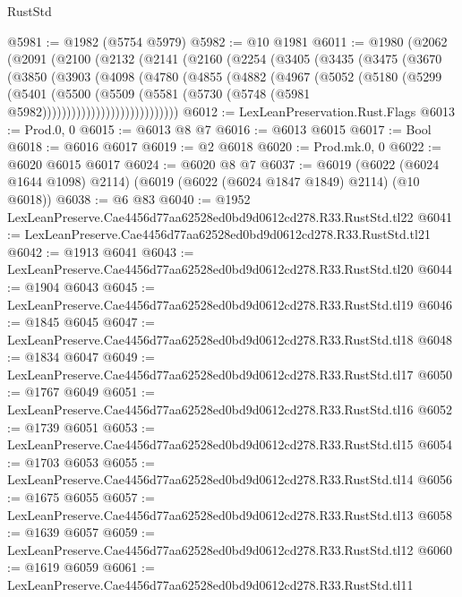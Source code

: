 \begin{lexlean}{RustStd}
\begin{coremodule}
@5981 := @1982 (@5754 @5979)
@5982 := @10 @1981
@6011 := @1980
    (@2062
      (@2091
        (@2100
          (@2132
            (@2141
              (@2160
                (@2254
                  (@3405
                    (@3435
                      (@3475
                        (@3670
                          (@3850
                            (@3903
                              (@4098
                                (@4780
                                  (@4855
                                    (@4882
                                      (@4967
                                        (@5052
                                          (@5180
                                            (@5299
                                              (@5401
                                                (@5500
                                                  (@5509
                                                    (@5581
                                                      (@5730
                                                        (@5748
                                                          (@5981 @5982))))))))))))))))))))))))))))
@6012 := LexLeanPreservation.Rust.Flags
@6013 := Prod.{0, 0}
@6015 := @6013 @8 @7
@6016 := @6013 @6015
@6017 := Bool
@6018 := @6016 @6017
@6019 := @2 @6018
@6020 := Prod.mk.{0, 0}
@6022 := @6020 @6015 @6017
@6024 := @6020 @8 @7
@6037 := @6019
    (@6022 (@6024 @1644 @1098) @2114)
    (@6019 (@6022 (@6024 @1847 @1849) @2114) (@10 @6018))
@6038 := @6 @83
@6040 := @1952 LexLeanPreserve.Cae4456d77aa62528ed0bd9d0612cd278.R33.RustStd.tl22
@6041 := LexLeanPreserve.Cae4456d77aa62528ed0bd9d0612cd278.R33.RustStd.tl21
@6042 := @1913 @6041
@6043 := LexLeanPreserve.Cae4456d77aa62528ed0bd9d0612cd278.R33.RustStd.tl20
@6044 := @1904 @6043
@6045 := LexLeanPreserve.Cae4456d77aa62528ed0bd9d0612cd278.R33.RustStd.tl19
@6046 := @1845 @6045
@6047 := LexLeanPreserve.Cae4456d77aa62528ed0bd9d0612cd278.R33.RustStd.tl18
@6048 := @1834 @6047
@6049 := LexLeanPreserve.Cae4456d77aa62528ed0bd9d0612cd278.R33.RustStd.tl17
@6050 := @1767 @6049
@6051 := LexLeanPreserve.Cae4456d77aa62528ed0bd9d0612cd278.R33.RustStd.tl16
@6052 := @1739 @6051
@6053 := LexLeanPreserve.Cae4456d77aa62528ed0bd9d0612cd278.R33.RustStd.tl15
@6054 := @1703 @6053
@6055 := LexLeanPreserve.Cae4456d77aa62528ed0bd9d0612cd278.R33.RustStd.tl14
@6056 := @1675 @6055
@6057 := LexLeanPreserve.Cae4456d77aa62528ed0bd9d0612cd278.R33.RustStd.tl13
@6058 := @1639 @6057
@6059 := LexLeanPreserve.Cae4456d77aa62528ed0bd9d0612cd278.R33.RustStd.tl12
@6060 := @1619 @6059
@6061 := LexLeanPreserve.Cae4456d77aa62528ed0bd9d0612cd278.R33.RustStd.tl11

\end{coremodule}
\end{lexlean}
